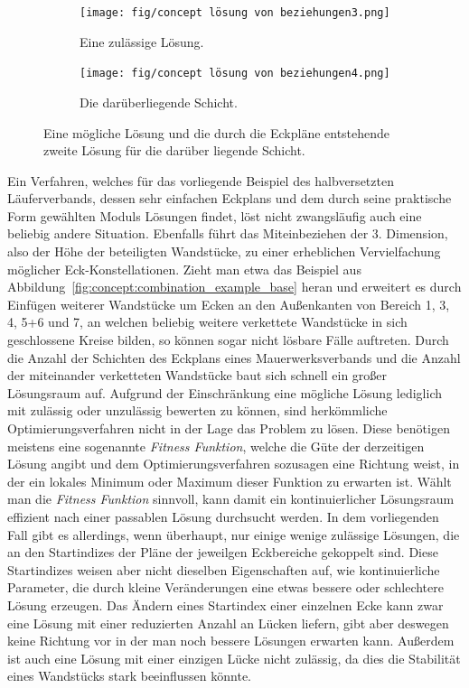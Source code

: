 \begin{figure}[ht!]
    \centering
    \begin{subfigure}[b]{0.4\columnwidth}
      \texttt{[image: fig/concept lösung von beziehungen3.png]}
      \caption{Eine zulässige Lösung.}
      \label{fig:concept:loesen_von_beziehungen3}
    \end{subfigure}
    \hfil
    \begin{subfigure}[b]{0.4\columnwidth}
      \texttt{[image: fig/concept lösung von beziehungen4.png]}
      \caption{Die darüberliegende Schicht.}
      \label{fig:concept:loesen_von_beziehungen4}
    \end{subfigure}
  \caption{Eine mögliche Lösung und die durch die Eckpläne entstehende zweite Lösung für die darüber liegende Schicht.}
  \label{fig:concept:loesen_von_beziehungen3und4}
\end{figure}

Ein Verfahren, welches für das vorliegende Beispiel des halbversetzten Läuferverbands, dessen sehr einfachen Eckplans und dem durch seine praktische Form gewählten Moduls Lösungen findet, löst nicht zwangsläufig auch eine beliebig andere Situation.
Ebenfalls führt das Miteinbeziehen der 3. Dimension, also der Höhe der beteiligten Wandstücke, zu einer erheblichen Vervielfachung möglicher Eck-Konstellationen.
Zieht man etwa das Beispiel aus Abbildung~\ref{fig:concept:combination_example_base} heran und erweitert es durch Einfügen weiterer Wandstücke um Ecken an den Außenkanten von Bereich 1, 3, 4, 5+6 und 7, an welchen beliebig weitere verkettete Wandstücke in sich geschlossene Kreise bilden, so können sogar nicht lösbare Fälle auftreten.
Durch die Anzahl der Schichten des Eckplans eines Mauerwerksverbands und die Anzahl der miteinander verketteten Wandstücke baut sich schnell ein großer Lösungsraum auf.
Aufgrund der Einschränkung eine mögliche Lösung lediglich mit zulässig oder unzulässig bewerten zu können, sind herkömmliche Optimierungsverfahren nicht in der Lage das Problem zu lösen.
Diese benötigen meistens eine sogenannte \textit{Fitness Funktion}, welche die Güte der derzeitigen Lösung angibt und dem Optimierungsverfahren sozusagen eine Richtung weist, in der ein lokales Minimum oder Maximum dieser Funktion zu erwarten ist.
Wählt man die \textit{Fitness Funktion} sinnvoll, kann damit ein kontinuierlicher Lösungsraum effizient nach einer passablen Lösung durchsucht werden.
In dem vorliegenden Fall gibt es allerdings, wenn überhaupt, nur einige wenige zulässige Lösungen, die an den Startindizes der Pläne der jeweilgen Eckbereiche gekoppelt sind.
Diese Startindizes weisen aber nicht dieselben Eigenschaften auf, wie kontinuierliche Parameter, die durch kleine Veränderungen eine etwas bessere oder schlechtere Lösung erzeugen.
Das Ändern eines Startindex einer einzelnen Ecke kann zwar eine Lösung mit einer reduzierten Anzahl an Lücken liefern, gibt aber deswegen keine Richtung vor in der man noch bessere Lösungen erwarten kann.
Außerdem ist auch eine Lösung mit einer einzigen Lücke nicht zulässig, da dies die Stabilität eines Wandstücks stark beeinflussen könnte.

